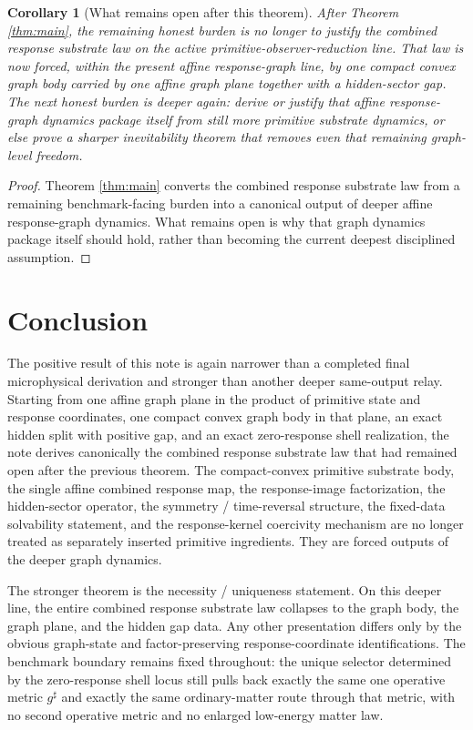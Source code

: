 \documentclass[11pt]{article}
\newcommand{\CompletedMetric}{g^{\sharp}}
\newtheorem{corollary}{Corollary}
\begin{document}
\begin{corollary}[What remains open after this theorem]
\label{cor:next}
After Theorem \ref{thm:main}, the remaining honest burden is no longer to justify the combined response substrate law on the active primitive-observer-reduction line. That law is now forced, within the present affine response-graph line, by one compact convex graph body carried by one affine graph plane together with a hidden-sector gap. The next honest burden is deeper again: derive or justify that affine response-graph dynamics package itself from still more primitive substrate dynamics, or else prove a sharper inevitability theorem that removes even that remaining graph-level freedom.
\end{corollary}

\begin{proof}
Theorem \ref{thm:main} converts the combined response substrate law from a remaining benchmark-facing burden into a canonical output of deeper affine response-graph dynamics. What remains open is why that graph dynamics package itself should hold, rather than becoming the current deepest disciplined assumption.
\end{proof}

\section{Conclusion}

The positive result of this note is again narrower than a completed final microphysical derivation and stronger than another deeper same-output relay. Starting from one affine graph plane in the product of primitive state and response coordinates, one compact convex graph body in that plane, an exact hidden split with positive gap, and an exact zero-response shell realization, the note derives canonically the combined response substrate law that had remained open after the previous theorem. The compact-convex primitive substrate body, the single affine combined response map, the response-image factorization, the hidden-sector operator, the symmetry / time-reversal structure, the fixed-data solvability statement, and the response-kernel coercivity mechanism are no longer treated as separately inserted primitive ingredients. They are forced outputs of the deeper graph dynamics.

The stronger theorem is the necessity / uniqueness statement. On this deeper line, the entire combined response substrate law collapses to the graph body, the graph plane, and the hidden gap data. Any other presentation differs only by the obvious graph-state and factor-preserving response-coordinate identifications. The benchmark boundary remains fixed throughout: the unique selector determined by the zero-response shell locus still pulls back exactly the same one operative metric \(\CompletedMetric\) and exactly the same ordinary-matter route through that metric, with no second operative metric and no enlarged low-energy matter law.
\end{document}
